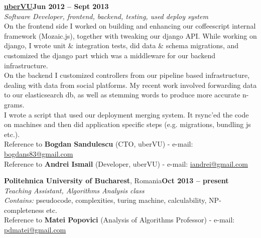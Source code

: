 \documentclass[margin,line]{resume}
\begin{document}
\begin{resume}
	\vspace{1.2mm}\href{http://www.ubervu.com}{\textbf{uberVU}}\hfill \textbf{Jun 2012 -- Sept 2013}\vspace{1.2mm}\\
	\vspace{1mm} \textsl{Software Developer, frontend, backend, testing, used deploy system}\vspace{1.5mm}\\
	On the frontend side I worked on building and enhancing our coffeescript internal framework (Mozaic.js), together with tweaking our django API. While working on django, I wrote unit \& integration tests, did data \& schema migrations, and customized the django part which was a middleware for our backend infrastructure.\\
	On the backend I customized controllers from our pipeline based infrastructure, dealing with data from social platforms. My recent work involved forwarding data to our elasticsearch db, as well as stemming words to produce more accurate n-grams.\\
	I wrote a script that used our deployment merging system. It rsync'ed the code on machines and then did application specific steps (e.g. migrations, bundling js etc.).\vspace{1.5mm}\\
	\small{Reference to \textbf{Bogdan Sandulescu} (CTO, uberVU) - e-mail: \href{mailto:bogdans83@gmail.com}{bogdans83@gmail.com}}\\
	\small{Reference to \textbf{Andrei Ismail} (Developer, uberVU) - e-mail: \href{mailto:iandrei@gmail.com}{iandrei@gmail.com}}

	\vspace{1.2mm}\textbf{Politehnica University of Bucharest}, Romania\hfill \textbf{Oct 2013 -- present}\vspace{1.2mm}\\
	\vspace{1mm} \textsl{Teaching Assistant, Algorithms Analysis class}\vspace{1.5mm}\\
	\textit{Contains:} pseudocode, complexities, turing machine, calculability, NP-completeness etc.\vspace{1.5mm}\\
	\small{Reference to \textbf{Matei Popovici} (Analysis of Algorithms Professor) - e-mail: \href{mailto:pdmatei@gmail.com}{pdmatei@gmail.com}}


\end{resume}
\end{document}
